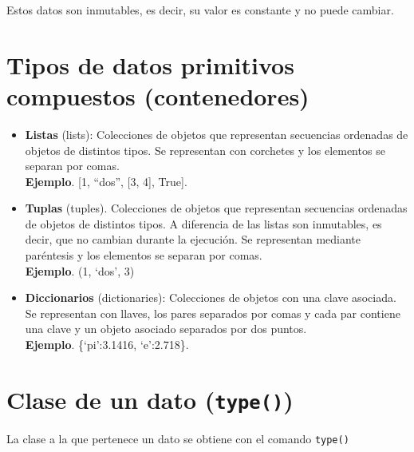 \documentclass[
  spanish,
  a4paper,
]{scrreport}
\providecommand{\tightlist}{%
  \setlength{\itemsep}{0pt}\setlength{\parskip}{0pt}}
\begin{document}
Estos datos son inmutables, es decir, su valor es constante y no puede
cambiar.

\section{Tipos de datos primitivos compuestos
(contenedores)}\label{tipos-de-datos-primitivos-compuestos-contenedores}

\begin{itemize}
\tightlist
\item
  \textbf{Listas} (lists): Colecciones de objetos que representan
  secuencias ordenadas de objetos de distintos tipos. Se representan con
  corchetes y los elementos se separan por comas.\\
  \textbf{Ejemplo}. {[}1, ``dos'', {[}3, 4{]}, True{]}.
\item
  \textbf{Tuplas} (tuples). Colecciones de objetos que representan
  secuencias ordenadas de objetos de distintos tipos. A diferencia de
  las listas son inmutables, es decir, que no cambian durante la
  ejecución. Se representan mediante paréntesis y los elementos se
  separan por comas.\\
  \textbf{Ejemplo}. (1, `dos', 3)
\item
  \textbf{Diccionarios} (dictionaries): Colecciones de objetos con una
  clave asociada. Se representan con llaves, los pares separados por
  comas y cada par contiene una clave y un objeto asociado separados por
  dos puntos.\\
  \textbf{Ejemplo}. \{`pi':3.1416, `e':2.718\}.
\end{itemize}

\section{\texorpdfstring{Clase de un dato
(\texttt{type()})}{Clase de un dato (type())}}\label{clase-de-un-dato-type}

La clase a la que pertenece un dato se obtiene con el comando
\texttt{type()}
\end{document}
